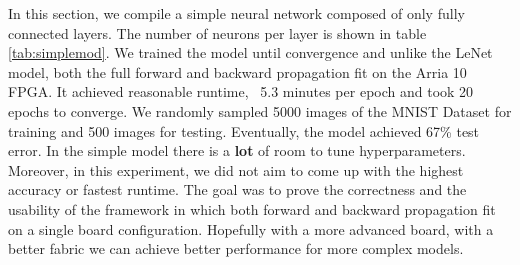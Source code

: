 In this section, we compile a simple neural network composed of only fully connected layers. The number of neurons per layer is shown in table \ref{tab:simplemod}. We trained the model until convergence and unlike the LeNet model, both the full forward and backward propagation fit on the Arria 10 FPGA. 
It achieved reasonable runtime, ~5.3 minutes per epoch and took 20 epochs to converge. We randomly sampled 5000 images of the MNIST Dataset for training and 500 images for testing. Eventually, the model achieved 67\% test error. In the simple model there is a \textbf{lot} of room to tune hyperparameters. Moreover, in this experiment, we did not aim to come up with the highest accuracy or fastest runtime.  The goal was to prove the correctness and the usability of the framework in which both forward and backward propagation fit on a single board configuration. Hopefully with a more advanced board, with a better fabric we can achieve better performance for more complex models.

